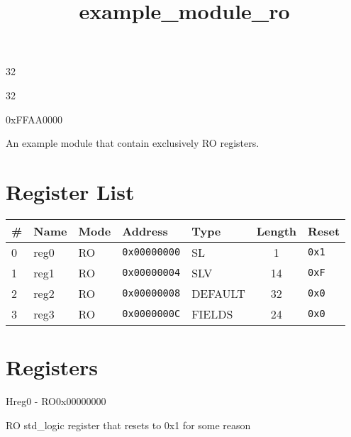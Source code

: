 \documentclass{article}
\title{example{\_}module{\_}ro}
\author{}
\date{}
\begin{document}
\maketitle

\begin{description}[leftmargin=!,labelwidth=\widthof{\bfseries Address width: }]
\item [Address width: ] 32
\item [Data width: ] 32
\item [Base address: ] 0xFFAA0000
\end{description}


An example module that contain exclusively RO registers.

\section{Register List}

\begin{table}[h!]
  \begin{center}
    \label{tab:table1}
    \begin{tabularx}{\linewidth}{|l|X|l|l|l|c|l|}
      \hline
      \textbf{\#} & \textbf{Name} & \textbf{Mode} & \textbf{Address} & \textbf{Type} & \textbf{Length} &
      \textbf{Reset} \\
      \hline
      0 & reg0 & RO & \texttt{0x00000000} & SL & 1 & \texttt{0x1} \\
      \hline
      1 & reg1 & RO & \texttt{0x00000004} & SLV & 14 & \texttt{0xF} \\
      \hline
      2 & reg2 & RO & \texttt{0x00000008} & DEFAULT & 32 & \texttt{0x0} \\
      \hline
      3 & reg3 & RO & \texttt{0x0000000C} & FIELDS & 24 & \texttt{0x0} \\
      \hline
    \end{tabularx}
  \end{center}
\end{table}

\section{Registers}

\begin{register}{H}{reg0 - RO}{0x00000000}
  \par RO std{\_}logic register that resets to 0x1 for some reason \regnewline
  \label{reg0}
\regnewline
\end{register}
\end{document}

